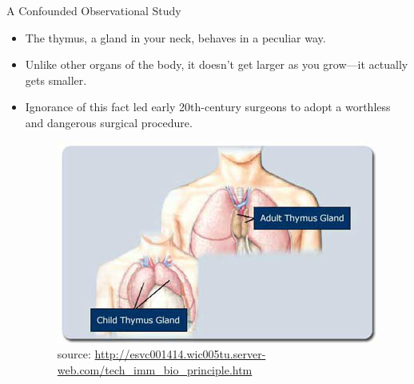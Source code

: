 \documentclass[handout]{beamer}
\begin{document}
\begin{frame}{A Confounded Observational Study}
\scriptsize{

\begin{itemize}

 \item The thymus, a gland in your neck, behaves in a peculiar way. 
 
 \item Unlike other organs of the body, it doesn't get larger as you grow—it actually gets smaller. 
 \item Ignorance of this fact led early 20th-century surgeons to adopt a worthless and dangerous surgical procedure.
 
 \begin{figure}[h!]
	\centering
	\includegraphics[scale=0.4]{pics/ThymusSizeDiagram.jpg}
	\caption{source: \url{http://esvc001414.wic005tu.server-web.com/tech_imm_bio_principle.htm}}
\end{figure}
 
  
\end{itemize}



} 
\end{frame}
\end{document}
